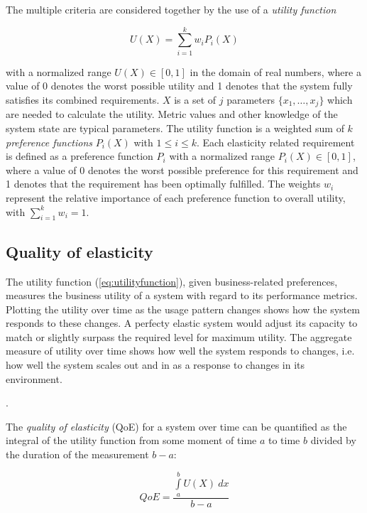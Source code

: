\documentclass[english]{tktltiki2}
\theoremstyle{definition}
\theoremstyle{remark}
\begin{document}
The multiple criteria are considered together by the use of a \emph{utility
function}

\begin{equation}
U(X) = \sum\limits_{i=1}^k w_{i}P_{i}(X) \label{eq:utilityfunction}
\end{equation}

with a normalized range $U(X) \in [0, 1]$ in the domain of real numbers, where a
value of 0 denotes the worst possible utility and 1 denotes that the system
fully satisfies its combined requirements. $X$ is a set of $j$ parameters
$\{x_{1}, \dots, x_{j}\}$ which are needed to calculate the utility. Metric
values and other knowledge of the system state are typical parameters. The
utility function is a weighted sum of $k$ \emph{preference functions} $P_{i}(X)$
with $1 \le i \le k$. Each elasticity related requirement is defined as a
preference function $P_{i}$ with a normalized range $P_{i}(X) \in [0, 1]$, where
a value of 0 denotes the worst possible preference for this requirement and 1
denotes that the requirement has been optimally fulfilled. The weights $w_{i}$
represent the relative importance of each preference function to overall
utility, with $\sum_{i=1}^k w_{i} = 1$.


\subsection{Quality of elasticity} The utility function (\ref{eq:utilityfunction}),
given business-related preferences, measures the business utility of a system
with regard to its performance metrics. Plotting the utility over time as the
usage pattern changes shows how the system responds to these changes. A perfecty
elastic system would adjust its capacity to match or slightly surpass the
required level for maximum utility. The aggregate measure of utility over time
shows how well the system responds to changes, i.e. how well the system scales
out and in as a response to changes in its environment.

.

The \emph{quality of elasticity} (QoE) for a system over time can be quantified
as the integral of the utility function from some moment of time $a$ to time
$b$ divided by the duration of the measurement $b - a$:

\begin{equation}
QoE = \frac{\int\limits_a^b U(X)~dx}{b-a} \label{eq:qoefunction}
\end{equation}
\end{document}
